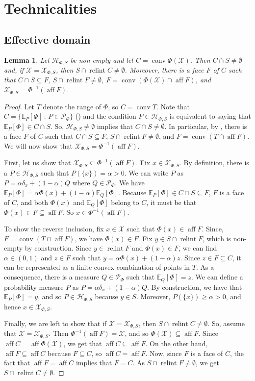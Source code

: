 \documentclass[10pt, a4paper]{article}
\newcommand{\E}{\mathbb E}
\newcommand{\Hh}{\mathcal H}
\newcommand{\HhP}{\Hh_{\Phi,S}}
\newcommand{\PR}{\mathscr{P}}
\newcommand{\X}{\mathcal X}
\newcommand{\XP}{\X_{\Phi,S}}
\DeclareMathOperator{\aff}{aff}
\DeclareMathOperator{\conv}{conv}
\DeclareMathOperator{\relint}{relint}
\newtheorem{lemma}{Lemma}
\begin{document}
\section{Technicalities}\label{app:tech}

    \subsection{Effective domain}
    \begin{lemma}\label{lemma:exF}
        Let $\HhP$ be non-empty and let $C=\conv\Phi(\X)$. Then $C\cap S\neq\emptyset$ and, if $\X = \XP$, then $S \cap \relint C  \neq \emptyset$. Moreover, there is a face $F$ of $C$ such that $C\cap S\subseteq F$, $S\cap\relint F\neq\emptyset$,  $F = \conv(\Phi(\X)\cap\aff F)$, and $\XP = \Phi^{-1}(\aff F)$. 
    \end{lemma}
    \begin{proof}
        Let $T$ denote the range of $\Phi$, so $C=\conv T$. Note that $C = \{\E_P[\Phi]\,:\,P\in\PR_\Phi\}$ () and the condition $P\in\HhP$ is equivalent to saying that $\E_P[\Phi]\in C\cap S$. So, $\HhP\neq\emptyset$ implies that $C\cap S\neq\emptyset$. In particular, by , there is a face $F$ of $C$ such that $C\cap S\subseteq F$, $S\cap \relint F \neq\emptyset$, and $F = \conv(T\cap\aff F)$. We will now show that $\XP = \Phi^{-1}(\aff F)$. 
        
        First, let us show that $\XP\subseteq\Phi^{-1}(\aff F)$. Fix $x\in\XP$. By definition, there is a $P\in\HhP$ such that $P(\{x\})=\alpha>0$. We can write $P$ as $P = \alpha\delta_x + (1-\alpha)Q$ where $Q\in\PR_\Phi$. We have $\E_P[\Phi] = \alpha\Phi(x) + (1-\alpha)\E_Q[\Phi]$. 
        Because $\E_P[\Phi]\in C\cap S\subseteq F$, $F$ is a face of $C$, and both $\Phi(x)$ and $\E_Q[\Phi]$ belong to $C$, it must be that $\Phi(x)\in F\subseteq \aff F$. So $x\in \Phi^{-1}(\aff F)$. 
    
        To show the reverse inclusion, fix $x\in\X$ such that $\Phi(x)\in\aff F$. Since, $F=\conv(T\cap\aff F)$, we have $\Phi(x)\in F$. Fix $y\in S\cap\relint F$, which is non-empty by construction. Since $y\in\relint F$ and $\Phi(x)\in F$, we can find $\alpha\in(0,1)$ and $z\in F$ such that $y = \alpha \Phi(x) + (1-\alpha)z.$ Since $z\in F\subseteq C$, it can be represented as a finite convex combination of points in $T$. As a consequence, there is a measure $Q\in\PR_\Phi$ such that $\E_Q[\Phi] = z$. We can define a probability measure $P$ as
        $P = \alpha\delta_x + (1-\alpha)Q.$
        By construction, we have that $\E_P[\Phi] = y$, and so $P\in\HhP$ because $y\in S$. Moreover, $P(\{x\})\geq \alpha>0$, and hence $x\in\XP$. 
    
        Finally, we are left to show that if $\X=\XP$, then $S\cap\relint C\neq\emptyset$. So, assume that $\X=\XP$. Then $\Phi^{-1}(\aff F ) = \X$, and so  $\Phi(\X)\subseteq\aff F$. Since $\aff C = \aff\Phi(\X)$, we get that $\aff C\subseteq\aff F$. On the other hand, $\aff F\subseteq \aff C$ because $F\subseteq C$, so $\aff C = \aff F$. Now, since $F$ is a face of $C$, the fact that $\aff F=\aff C$ implies that $F=C$. As $S \cap \relint F \neq \emptyset$, we get $S \cap \relint C \neq \emptyset$.
    \end{proof}
\end{document}
